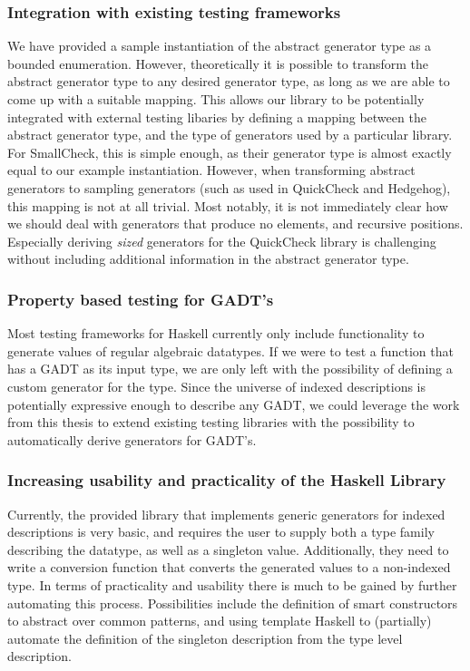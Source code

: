 \documentclass[a4paper,msc,twosized=semi]{uustthesis}
\begin{document}
\subsubsection{Integration with existing testing frameworks}

  We have provided a sample instantiation of the abstract generator type as a bounded enumeration. However, theoretically it is possible to transform the abstract generator type to any desired generator type, as long as we are able to come up with a suitable mapping. This allows our library to be potentially integrated with external testing libaries by defining a mapping between the abstract generator type, and the type of generators used by a particular library. For SmallCheck, this is simple enough, as their generator type is almost exactly equal to our example instantiation. However, when transforming abstract generators to sampling generators (such as used in QuickCheck and Hedgehog), this mapping is not at all trivial. Most notably, it is not immediately clear how we should deal with generators that produce no elements, and recursive positions. Especially deriving \emph{sized} generators for the QuickCheck library is challenging without including additional information in the abstract generator type. 

\subsubsection{Property based testing for GADT's}

  Most testing frameworks for Haskell currently only include functionality to generate values of regular algebraic datatypes. If we were to test a function that has a GADT as its input type, we are only left with the possibility of defining a custom generator for the type. Since the universe of indexed descriptions is potentially expressive enough to describe any GADT, we could leverage the work from this thesis to extend existing testing libraries with the possibility to automatically derive generators for GADT's. 

\subsubsection{Increasing usability and practicality of the Haskell Library}

  Currently, the provided library that implements generic generators for indexed descriptions is very basic, and requires the user to supply both a type family describing the datatype, as well as a singleton value. Additionally, they need to write a conversion function that converts the generated values to a non-indexed type. In terms of practicality and usability there is much to be gained by further automating this process. Possibilities include the definition of smart constructors to abstract over common patterns, and using template Haskell \cite{sheard2002template} to (partially) automate the definition of the singleton description from the type level description. 
\end{document}
